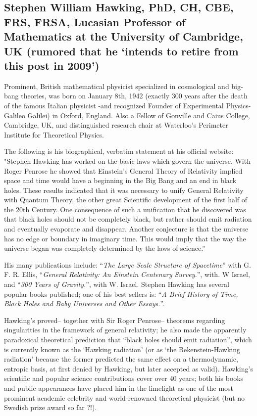 \documentclass[12pt]{article}
\theoremstyle{plain}
\theoremstyle{definition}
\numberwithin{equation}{section}
\begin{document}
\subsection{Stephen William Hawking, PhD, CH, CBE, FRS, FRSA, Lucasian Professor of Mathematics at the University of Cambridge, UK (rumored that he `intends to retire from this post in 2009')} 
 Prominent, British mathematical physicist specialized in cosmological and big-bang theories, was born on January 8th, 1942 (exactly 300 years after the death of the famous Italian physicist -and recognized Founder of Experimental Physics- Galileo Galilei) in Oxford, England.  Also a Fellow of Gonville and Caius College, Cambridge, UK, and distinguished research chair at Waterloo's Perimeter Institute for Theoretical Physics.

The following is his biographical, verbatim statement at his official website:
"Stephen Hawking has worked on the basic laws which govern the universe. With Roger Penrose he showed that Einstein's General Theory of Relativity implied space and time would have a beginning in the Big Bang and an end in black holes. These results indicated that it was necessary to unify General Relativity with Quantum Theory, the other great Scientific development of the first half of the 20th Century. One consequence of such a unification that he discovered was that black holes should not be completely black, but rather should emit radiation and eventually evaporate and disappear. Another conjecture is that the universe has no edge or boundary in imaginary time. This would imply that the way the universe began was completely determined by the laws of science.''

 His many publications include: ``{\em The Large Scale Structure of Spacetime}'' with G. F. R. Ellis, ``{\em General Relativity: An Einstein Centenary Survey.}'', with. W Israel, and ``{\em 300 Years of Gravity.}'', with W. Israel. Stephen Hawking has several popular books published; one of his best sellers is: ``{\em A Brief History of Time, Black Holes and Baby Universes and Other Essays.}''. 

 Hawking's proved-- together with Sir Roger Penrose-- theorems regarding singularities in the framework of general relativity; he also made the apparently paradoxical theoretical prediction that ``black holes should emit radiation'', which is currently known as the `Hawking radiation' (or as `the Bekenstein-Hawking radiation' because the former
predicted the same effect on a thermodynamic, entropic basis, at first denied by Hawking, but later accepted as valid). Hawking's scientific and popular science contributions cover over 40 years; both his books and public appearances have placed him in the limelight as one of the most prominent academic celebrity and world-renowned theoretical physicist (but no Swedish prize award so far ?!).
\end{document}
